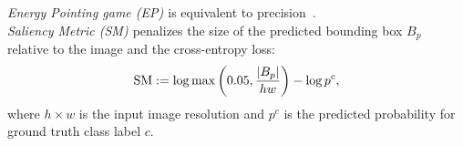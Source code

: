 \noindent \emph{Energy Pointing game (EP) \autocite{wang2020score}} is equivalent to precision~.\\

\noindent \emph{Saliency Metric (SM) \autocite{dabkowski2017real}} penalizes the size of the predicted bounding 
box $B_p$ relative to the image and the cross-entropy loss:
\begin{equation}
	\operatorname{SM} \mathrel{:=} \log \max\left({ 0.05, \frac{\left|{B_p}\right|}{hw} }\right) - \log p^c,
\label{eq:sm}
\end{equation}
where $h \times w$ is the input image resolution and $p^c$ is the predicted probability for ground 
truth class label $c$.